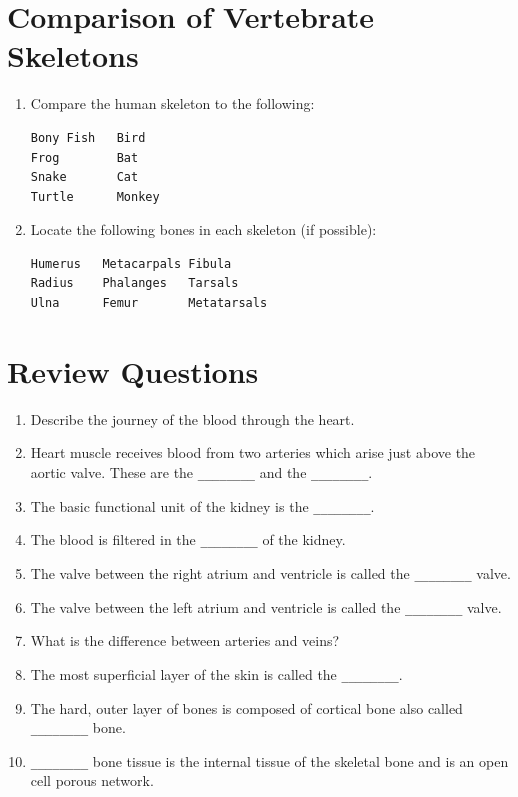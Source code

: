 \documentclass[]{book}
\providecommand{\tightlist}{%
  \setlength{\itemsep}{0pt}\setlength{\parskip}{0pt}}
\theoremstyle{definition}
\theoremstyle{definition}
\theoremstyle{definition}
\theoremstyle{remark}
\begin{document}
\section{Comparison of Vertebrate
Skeletons}\label{comparison-of-vertebrate-skeletons}

\begin{enumerate}
\def\labelenumi{\arabic{enumi}.}
\item
  Compare the human skeleton to the following:

\begin{verbatim}
Bony Fish   Bird
Frog        Bat
Snake       Cat
Turtle      Monkey
\end{verbatim}
\item
  Locate the following bones in each skeleton (if possible):

\begin{verbatim}
Humerus   Metacarpals Fibula
Radius    Phalanges   Tarsals
Ulna      Femur       Metatarsals
\end{verbatim}
\end{enumerate}

\section{Review Questions}\label{review-questions-9}

\begin{enumerate}
\def\labelenumi{\arabic{enumi}.}
\tightlist
\item
  Describe the journey of the blood through the heart.
\item
  Heart muscle receives blood from two arteries which arise just above
  the aortic valve. These are the \texttt{\_\_\_\_\_\_\_\_} and the
  \texttt{\_\_\_\_\_\_\_\_}.
\item
  The basic functional unit of the kidney is the
  \texttt{\_\_\_\_\_\_\_\_}.
\item
  The blood is filtered in the \texttt{\_\_\_\_\_\_\_\_} of the kidney.
\item
  The valve between the right atrium and ventricle is called the
  \texttt{\_\_\_\_\_\_\_\_} valve.
\item
  The valve between the left atrium and ventricle is called the
  \texttt{\_\_\_\_\_\_\_\_} valve.
\item
  What is the difference between arteries and veins?
\item
  The most superficial layer of the skin is called the
  \texttt{\_\_\_\_\_\_\_\_}.
\item
  The hard, outer layer of bones is composed of cortical bone also
  called \texttt{\_\_\_\_\_\_\_\_} bone.
\item
  \texttt{\_\_\_\_\_\_\_\_} bone tissue is the internal tissue of the
  skeletal bone and is an open cell porous network.  
\end{enumerate}
\end{document}
